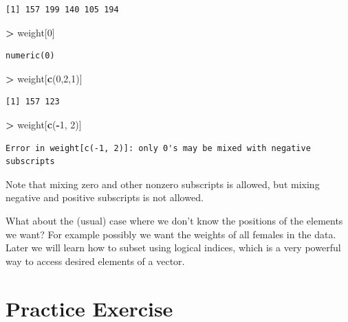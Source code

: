 \documentclass[]{krantz}
\makeatletter
\newenvironment{Shaded}{\begin{snugshade}}{\end{snugshade}}
\newcommand{\KeywordTok}[1]{\textcolor[rgb]{0.27,0.27,0.27}{\textbf{#1}}}
\newcommand{\DecValTok}[1]{\textcolor[rgb]{0.06,0.06,0.06}{#1}}
\newcommand{\StringTok}[1]{\textcolor[rgb]{0.5,0.5,0.5}{#1}}
\newcommand{\OperatorTok}[1]{\textcolor[rgb]{0.43,0.43,0.43}{\textbf{#1}}}
\newcommand{\NormalTok}[1]{#1}
\newenvironment{kframe}{%
\medskip{}
\setlength{\fboxsep}{.8em}
 \def\at@end@of@kframe{}%
 \ifinner\ifhmode%
  \def\at@end@of@kframe{\end{minipage}}%
  \begin{minipage}{\columnwidth}%
 \fi\fi%
 \def\FrameCommand##1{\hskip\@totalleftmargin \hskip-\fboxsep
 \colorbox{shadecolor}{##1}\hskip-\fboxsep
     \hskip-\linewidth \hskip-\@totalleftmargin \hskip\columnwidth}%
 \MakeFramed {\advance\hsize-\width
   \@totalleftmargin\z@ \linewidth\hsize
   \@setminipage}}%
 {\par\unskip\endMakeFramed%
 \at@end@of@kframe}
\renewenvironment{Shaded}{\begin{kframe}}{\end{kframe}}
\makeatother
\begin{document}
\begin{verbatim}
[1] 157 199 140 105 194
\end{verbatim}

\begin{Shaded}
\begin{Highlighting}[]
\OperatorTok{>}\StringTok{ }\NormalTok{weight[}\DecValTok{0}\NormalTok{]}
\end{Highlighting}
\end{Shaded}

\begin{verbatim}
numeric(0)
\end{verbatim}

\begin{Shaded}
\begin{Highlighting}[]
\OperatorTok{>}\StringTok{ }\NormalTok{weight[}\KeywordTok{c}\NormalTok{(}\DecValTok{0}\NormalTok{,}\DecValTok{2}\NormalTok{,}\DecValTok{1}\NormalTok{)]}
\end{Highlighting}
\end{Shaded}

\begin{verbatim}
[1] 157 123
\end{verbatim}

\begin{Shaded}
\begin{Highlighting}[]
\OperatorTok{>}\StringTok{ }\NormalTok{weight[}\KeywordTok{c}\NormalTok{(}\OperatorTok{-}\DecValTok{1}\NormalTok{, }\DecValTok{2}\NormalTok{)]}
\end{Highlighting}
\end{Shaded}

\begin{verbatim}
Error in weight[c(-1, 2)]: only 0's may be mixed with negative subscripts
\end{verbatim}

Note that mixing zero and other nonzero subscripts is allowed, but
mixing negative and positive subscripts is not allowed.

What about the (usual) case where we don't know the positions of the
elements we want? For example possibly we want the weights of all
females in the data. Later we will learn how to subset using logical
indices, which is a very powerful way to access desired elements of a
vector.

\section{Practice Exercise}\label{practice-exercise-1}
\end{document}
